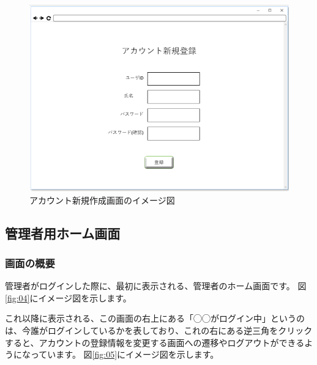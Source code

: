 \begin{figure}[htbp]
  \begin{center}
    \includegraphics[width=1\linewidth,clip]{./img/03.png}
    \caption{アカウント新規作成画面のイメージ図}\label{fig:03}
  \end{center}
\end{figure}

\newpage

\subsection{管理者用ホーム画面}
\subsubsection{画面の概要}
管理者がログインした際に、最初に表示される、管理者のホーム画面です。
図\ref{fig:04}にイメージ図を示します。

これ以降に表示される、この画面の右上にある「◯◯がログイン中」というのは、今誰がログインしているかを表しており、これの右にある逆三角をクリックすると、アカウントの登録情報を変更する画面への遷移やログアウトができるようになっています。
図\ref{fig:05}にイメージ図を示します。


